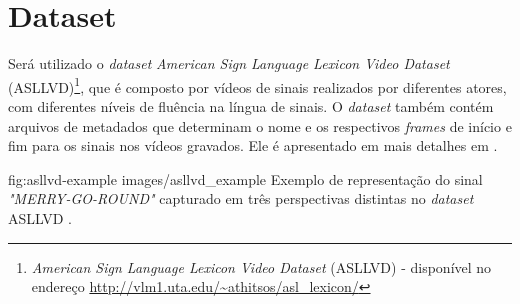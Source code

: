 \section{Dataset} %
\label{sec:dataset}
Será utilizado o \textit{dataset} \textit{American Sign Language Lexicon Video Dataset} (ASLLVD)\footnote{
    \textit{American Sign Language Lexicon Video Dataset} (ASLLVD) - disponível no endereço \url{http://vlm1.uta.edu/~athitsos/asl_lexicon/}
}, que é composto por vídeos de sinais realizados por diferentes atores, com diferentes níveis de fluência na língua de sinais. O \textit{dataset} também contém arquivos de metadados que determinam o nome e os respectivos \textit{frames} de início e fim para os sinais nos vídeos gravados. Ele é apresentado em mais detalhes em \cite{athitsos-asldataset-2008}.

\image
    {fig:asllvd-example}
    {images/asllvd_example}
    {Exemplo de representação do sinal \textit{"MERRY-GO-ROUND"} capturado em três perspectivas distintas no \textit{dataset} ASLLVD \cite{athitsos-asldataset-2008}.}

